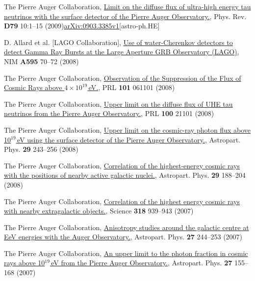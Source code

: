 \begin{etaremune}
\item {}The Pierre Auger Collaboration,
\href{http://dx.doi.org/10.1103/PhysRevD.79.102001}{{Limit on the diffuse
flux of ultra-high energy tau neutrinos with the surface detector of the Pierre
Auger Observatory.}}, Phys. Rev. {\bf D79} 10:1--15
(2009)\href{http://arxiv.org/abs/0903.3385/}{arXiv:0903.3385v1}[astro-ph.HE]

\item {}D. Allard { et al.} [LAGO Collaboration],
\href{http://dx.doi.org/10.1016/j.nima.2008.07.041}{{Use of
water-Cherenkov detectors to detect Gamma Ray Bursts at the Large Aperture GRB
Observatory (LAGO)}}, NIM {\bf A595} 70--72 (2008)

\item {}The Pierre Auger Collaboration,
\href{http://dx.doi.org/10.1103/PhysRevLett.101.061101}{{Observation of
the Suppression of the Flux of Cosmic Rays above $4\times10^{19}$\,eV.}}, PRL
{\bf 101} 061101 (2008)

\item {}The Pierre Auger Collaboration,
\href{http://dx.doi.org/10.1103/PhysRevLett.100.211101}{{Upper limit on
the diffuse flux of UHE tau neutrinos from the Pierre Auger Observatory.}}, PRL
{\bf 100} 21101 (2008)

\item {}The Pierre Auger Collaboration,
\href{http://dx.doi.org/10.1016/j.astropartphys.2008.01.003}{{Upper limit
on the cosmic-ray photon flux above 10$^{19}$\,eV using the surface detector of
the Pierre Auger Observatory.}}, Astropart. Phys. {\bf 29} 243--256 (2008)

\item {}The Pierre Auger Collaboration,
\href{http://dx.doi.org/10.1016/j.astropartphys.2008.01.002}{{Correlation
of the highest-energy cosmic rays with the positions of nearby active galactic
nuclei.}}, Astropart. Phys. {\bf 29} 188--204 (2008)

\item {}The Pierre Auger Collaboration,
\href{http://dx.doi.org/10.1126/science.1151124}{{Correlation of the
highest energy cosmic rays with nearby extragalactic objects.}}, Science {\bf
318} 939--943 (2007)

\item {}The Pierre Auger Collaboration,
\href{http://dx.doi.org/10.1016/j.astropartphys.2006.11.002}{{Anisotropy
studies around the galactic centre at EeV energies with the Auger
Observatory.}},  Astropart. Phys. {\bf 27} 244--253 (2007)

\item {}The Pierre Auger Collaboration,
\href{http://dx.doi.org/10.1016/j.astropartphys.2006.10.004}{{An upper
limit to the photon fraction in cosmic rays above 10$^{19}$\,eV from the Pierre
Auger Observatory.}}, Astropart. Phys. {\bf 27} 155--168 (2007)
\end{etaremune}
